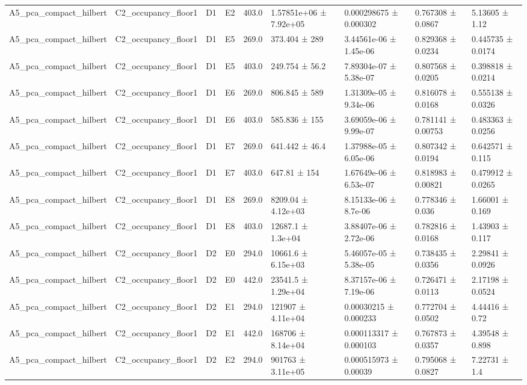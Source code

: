 \begin{table}
\begin{tabular}{lllllllll}
A5\_pca\_compact\_hilbert & C2\_occupancy\_floor1 & D1 & E2 & 403.0 & 1.57851e+06 ± 7.92e+05 & 0.000298675 ± 0.000302 & 0.767308 ± 0.0867 & 5.13605 ± 1.12 \\
A5\_pca\_compact\_hilbert & C2\_occupancy\_floor1 & D1 & E5 & 269.0 & 373.404 ± 289 & 3.44561e-06 ± 1.45e-06 & 0.829368 ± 0.0234 & 0.445735 ± 0.0174 \\
A5\_pca\_compact\_hilbert & C2\_occupancy\_floor1 & D1 & E5 & 403.0 & 249.754 ± 56.2 & 7.89304e-07 ± 5.38e-07 & 0.807568 ± 0.0205 & 0.398818 ± 0.0214 \\
A5\_pca\_compact\_hilbert & C2\_occupancy\_floor1 & D1 & E6 & 269.0 & 806.845 ± 589 & 1.31309e-05 ± 9.34e-06 & 0.816078 ± 0.0168 & 0.555138 ± 0.0326 \\
A5\_pca\_compact\_hilbert & C2\_occupancy\_floor1 & D1 & E6 & 403.0 & 585.836 ± 155 & 3.69059e-06 ± 9.99e-07 & 0.781141 ± 0.00753 & 0.483363 ± 0.0256 \\
A5\_pca\_compact\_hilbert & C2\_occupancy\_floor1 & D1 & E7 & 269.0 & 641.442 ± 46.4 & 1.37988e-05 ± 6.05e-06 & 0.807342 ± 0.0194 & 0.642571 ± 0.115 \\
A5\_pca\_compact\_hilbert & C2\_occupancy\_floor1 & D1 & E7 & 403.0 & 647.81 ± 154 & 1.67649e-06 ± 6.53e-07 & 0.818983 ± 0.00821 & 0.479912 ± 0.0265 \\
A5\_pca\_compact\_hilbert & C2\_occupancy\_floor1 & D1 & E8 & 269.0 & 8209.04 ± 4.12e+03 & 8.15133e-06 ± 8.7e-06 & 0.778346 ± 0.036 & 1.66001 ± 0.169 \\
A5\_pca\_compact\_hilbert & C2\_occupancy\_floor1 & D1 & E8 & 403.0 & 12687.1 ± 1.3e+04 & 3.88407e-06 ± 2.72e-06 & 0.782816 ± 0.0168 & 1.43903 ± 0.117 \\
A5\_pca\_compact\_hilbert & C2\_occupancy\_floor1 & D2 & E0 & 294.0 & 10661.6 ± 6.15e+03 & 5.46057e-05 ± 5.38e-05 & 0.738435 ± 0.0356 & 2.29841 ± 0.0926 \\
A5\_pca\_compact\_hilbert & C2\_occupancy\_floor1 & D2 & E0 & 442.0 & 23541.5 ± 1.29e+04 & 8.37157e-06 ± 7.19e-06 & 0.726471 ± 0.0113 & 2.17198 ± 0.0524 \\
A5\_pca\_compact\_hilbert & C2\_occupancy\_floor1 & D2 & E1 & 294.0 & 121907 ± 4.11e+04 & 0.00030215 ± 0.000233 & 0.772704 ± 0.0502 & 4.44416 ± 0.72 \\
A5\_pca\_compact\_hilbert & C2\_occupancy\_floor1 & D2 & E1 & 442.0 & 168706 ± 8.14e+04 & 0.000113317 ± 0.000103 & 0.767873 ± 0.0357 & 4.39548 ± 0.898 \\
A5\_pca\_compact\_hilbert & C2\_occupancy\_floor1 & D2 & E2 & 294.0 & 901763 ± 3.11e+05 & 0.000515973 ± 0.00039 & 0.795068 ± 0.0827 & 7.22731 ± 1.4 \\

\end{tabular}
\end{table}
